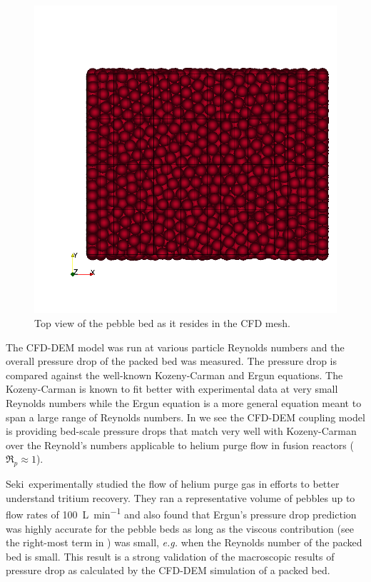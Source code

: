 \begin{figure}[t]
	\centering
	\includegraphics[width=\singleimagewidth]{figures/z-top-view}
    \caption{Top view of the pebble bed as it resides in the CFD mesh.}\label{fig:cfdem-domain-z}
\end{figure}


The CFD-DEM model was run at various particle Reynolds numbers and the overall pressure drop of the packed bed was measured. The pressure drop is compared against the well-known Kozeny-Carman and Ergun equations. The Kozeny-Carman is known to fit better with experimental data at very small Reynolds numbers while the Ergun equation is a more general equation meant to span a large range of Reynolds numbers. In  we see the CFD-DEM coupling model is providing bed-scale pressure drops that match very well with Kozeny-Carman over the Reynold’s numbers applicable to helium purge flow in fusion reactors ($\Re_p \approx 1$). 

Seki\etal~experimentally studied the flow of helium purge gas in efforts to better understand tritium recovery.\cite{Seki2013a} They ran a representative volume of pebbles up to flow rates of \SI{100}{\liter\per\minute} and also found that Ergun's pressure drop prediction was highly accurate for the pebble beds as long as the viscous contribution (see the right-most term in ) was small, \textit{e.g.} when the Reynolds number of the packed bed is small. This result is a strong validation of the macroscopic results of pressure drop as calculated by the CFD-DEM simulation of a packed bed.

